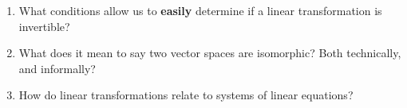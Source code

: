 \begin{enumerate}
%
\item What conditions allow us to {\bf easily} determine if a linear transformation is invertible?
%
\item What does it mean to say two vector spaces are isomorphic?  Both technically, and informally?
%
\item How do linear transformations relate to systems of linear equations?
%
\end{enumerate}